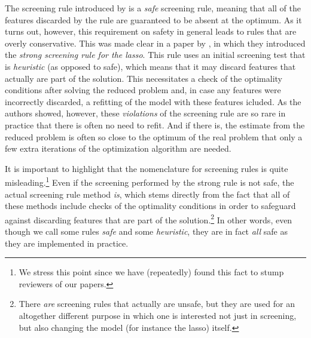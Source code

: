 The screening rule introduced by \textcite{elghaoui2010} is a \emph{safe} screening rule, meaning that all of the features discarded by the rule are guaranteed to be absent at the optimum. As it turns out, however, this requirement on safety in general leads to rules that are overly conservative. This was made clear in a paper by \textcite{tibshirani2012}, in which they introduced the \emph{strong screening rule for the lasso}. This rule uses an initial screening test that is \emph{heuristic} (as opposed to safe), which means that it may discard features that actually are part of the solution. This necessitates a check of the optimality conditions after solving the reduced problem and, in case any features were incorrectly discarded, a refitting of the model with these features icluded. As the authors showed, however, these \emph{violations} of the screening rule are so rare in practice that there is often no need to refit. And if there is, the estimate from the reduced problem is often so close to the optimum of the real problem that only a few extra iterations of the optimization algorithm are needed.

It is important to highlight that the nomenclature for screening rules is quite misleading.\footnote{We stress this point since we have (repeatedly) found this fact to stump reviewers of our papers.} Even if the screening performed by the strong rule is not safe, the actual screening rule method \emph{is}, which stems directly from the fact that all of these methods include checks of the optimality conditions in order to safeguard against discarding features that are part of the solution.\footnote{There \emph{are} screening rules that actually are unsafe, but they are used for an altogether different purpose in which one is interested not just in screening, but also changing the model (for instance the lasso) itself.} In other words, even though we call some rules \emph{safe} and some \emph{heuristic}, they are in fact \emph{all} safe as they are implemented in practice.

